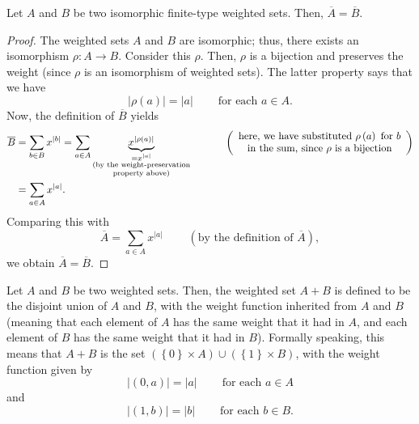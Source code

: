 \begin{proposition}
\label{prop.gf-ws.iso}
\leantarget
\leanok
Let $A$ and $B$ be two isomorphic finite-type weighted
sets. Then, $\overline{A}=\overline{B}$.
\end{proposition}

\begin{proof}
\leanok
The weighted sets $A$ and $B$ are isomorphic; thus,
there exists an isomorphism $\rho:A\rightarrow B$. Consider this $\rho$. Then,
$\rho$ is a bijection and preserves the weight (since $\rho$ is an isomorphism
of weighted sets). The latter property says that we have
\begin{equation}
\left\vert \rho\left(  a\right)  \right\vert =\left\vert a\right\vert
\ \ \ \ \ \ \ \ \ \ \text{for each }a\in A. \label{pf.prop.gf-ws.iso.wtpres}%
\end{equation}
Now, the definition of $\overline{B}$ yields%
\begin{align*}
\overline{B}  &  =\sum_{b\in B}x^{\left\vert b\right\vert }=\sum_{a\in
A}\underbrace{x^{\left\vert \rho\left(  a\right)  \right\vert }}%
_{\substack{=x^{\left\vert a\right\vert }\\\text{(by the weight-preservation}\\
\text{property above)}}}\ \ \ \ \ \ \ \ \ \ \left(
\begin{array}
[c]{c}%
\text{here, we have substituted }\rho\left(  a\right)  \text{ for }b\\
\text{in the sum, since }\rho\text{ is a bijection}%
\end{array}
\right) \\
&  =\sum_{a\in A}x^{\left\vert a\right\vert }.
\end{align*}
Comparing this with%
\[
\overline{A}=\sum_{a\in A}x^{\left\vert a\right\vert }%
\ \ \ \ \ \ \ \ \ \ \left(  \text{by the definition of }\overline{A}\right)
,
\]
we obtain $\overline{A}=\overline{B}$.
\end{proof}

\begin{definition}
\label{def.gf-ws.djun}
\leantarget
\leanok
Let $A$ and $B$ be two weighted sets. Then, the weighted
set $A+B$ is defined to be the disjoint union of $A$ and $B$, with the weight
function inherited from $A$ and $B$ (meaning that each element of $A$ has the
same weight that it had in $A$, and each element of $B$ has the same weight
that it had in $B$). Formally speaking, this means that $A+B$ is the set
$\left(  \left\{  0\right\}  \times A\right)  \cup\left(  \left\{  1\right\}
\times B\right)  $, with the weight function given by
\begin{equation}
\left\vert \left(  0,a\right)  \right\vert =\left\vert a\right\vert
\ \ \ \ \ \ \ \ \ \ \text{for each }a\in A \label{eq.def.gf-ws.djun.wt0}%
\end{equation}
and%
\begin{equation}
\left\vert \left(  1,b\right)  \right\vert =\left\vert b\right\vert
\ \ \ \ \ \ \ \ \ \ \text{for each }b\in B. \label{eq.def.gf-ws.djun.wt1}%
\end{equation}
\end{definition}

